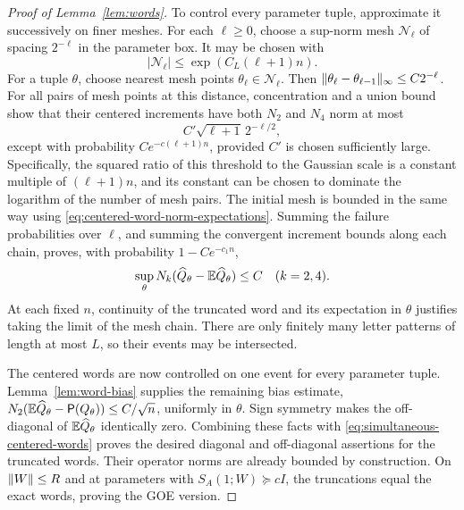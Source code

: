 \begin{proof}[Proof of Lemma~\ref{lem:words}]
To control every parameter tuple, approximate it successively
on finer meshes.  For each $\ell\ge0$, choose a sup-norm mesh
$\mathcal N_\ell$ of spacing $2^{-\ell}$ in the parameter box.  It may be chosen with
\[
 |\mathcal N_\ell|\le\exp(C_L(\ell+1)n).
\]
For a tuple $\theta$, choose nearest mesh points
$\theta_\ell\in\mathcal N_\ell$.  Then
$\lVert \theta_\ell-\theta_{\ell-1}\rVert_\infty\le C2^{-\ell}$.
For all pairs of mesh points at this distance, concentration and
a union bound show that their centered increments have both
$N_2$ and $N_4$ norm at most
\[
 C'\sqrt{\ell+1}\,2^{-\ell/2},
\]
except with probability $Ce^{-c(\ell+1)n}$, provided $C'$ is
chosen sufficiently large.  Specifically, the squared ratio
of this threshold to the Gaussian scale is a constant multiple
of $(\ell+1)n$, and its constant can be chosen to dominate the
logarithm of the number of mesh pairs.  The initial mesh is
bounded in the same way using
\eqref{eq:centered-word-norm-expectations}.  Summing the failure
probabilities over $\ell$, and summing the convergent increment
bounds along each chain, proves, with probability
$1-Ce^{-c_1n}$,
\begin{equation}\label{eq:simultaneous-centered-words}
 \sup_\theta N_k(\widehat Q_\theta-\mathbb E\widehat Q_\theta)\le C
 \quad(k=2,4).
\end{equation}
At each fixed $n$, continuity of the truncated word and its
expectation in $\theta$ justifies taking the limit of the mesh
chain.  There are only finitely many letter patterns of length
at most $L$, so their events may be intersected.

The centered words are now controlled on one event for every
parameter tuple.  Lemma~\ref{lem:word-bias} supplies the remaining
bias estimate,
$N_2(\mathbb E\widehat Q_\theta-\mathsf P(Q_\theta))\le C/\sqrt n$,
uniformly in $\theta$.  Sign symmetry makes the off-diagonal of
$\mathbb E\widehat Q_\theta$ identically zero.  Combining these facts
with \eqref{eq:simultaneous-centered-words} proves the desired
diagonal and off-diagonal assertions for the truncated words.
Their operator norms are already bounded by construction.
On $\lVert W\rVert\le R$ and at parameters with $S_A(1;W)\succeq cI$,
the truncations equal the exact words, proving the GOE version.


\end{proof}
